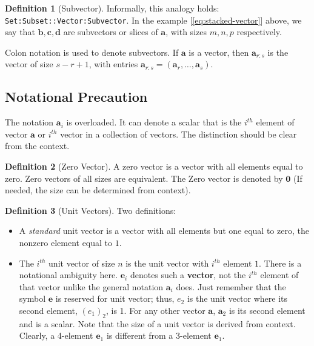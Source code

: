 \documentclass[11pt]{book}
\theoremstyle{definition}
\newtheorem{definition}{Definition}
\theoremstyle{plain}
\theoremstyle{problemstyle}
\theoremstyle{remark}
\theoremstyle{definition}
\begin{document}
\begin{definition}[Subvector]
    \label{def:subvector}
    Informally, this analogy holds: \texttt{Set:Subset::Vector:Subvector}.
    In the example [\ref{eq:stacked-vector}] above, we say that $\boldsymbol{b},\boldsymbol{c},\boldsymbol{d}$ are subvectors or slices of $\boldsymbol{a}$, with sizes $m,n,p$ respectively.

    Colon notation is used to denote subvectors. If $\boldsymbol{a}$ is a vector, then $\boldsymbol{a}_{r:s}$ is the vector of size $s−r+1$, with entries $\boldsymbol{a}_{r:s}=(\boldsymbol{a}_r,\dots,\boldsymbol{a}_s)$.
\end{definition}

\subsection*{Notational Precaution}
The notation $\boldsymbol{a}_i$ is overloaded. It can denote a scalar that is the $i^{th}$ element of vector $\boldsymbol{a}$ or $i^{th}$ vector in a collection of vectors. The distinction should be clear from the context.

\begin{definition}[Zero Vector]
    \label{def:zero-vector}
    A zero vector is a vector with all elements equal to zero. Zero vectors of all sizes are equivalent. The Zero vector is denoted by $\boldsymbol{0}$ (If needed, the size can be determined from context).
\end{definition}

\begin{definition}[Unit Vectors]
    \label{def:unit-vectors}
    Two definitions:

    \begin{itemize}
        \item A \emph{standard} unit vector is a vector with all elements but one equal to zero, the nonzero element equal to $1$.
        \item The $i^{th}$ unit vector of size $n$ is the unit vector with $i^{th}$ element $1$. There is a notational ambiguity here. $\boldsymbol{e}_i$ denotes such a \textbf{vector}, not the $i^{th}$ element of that vector unlike the general notation $\boldsymbol{a}_i$ does. Just remember that the symbol $\boldsymbol{e}$ is reserved for unit vector; thus, $e_2$ is the unit vector where its second element, $(e_1)_2$, is 1. For any other vector $\boldsymbol{a}$, $\boldsymbol{a}_2$ is its second element and is a scalar. Note that the size of a unit vector is derived from context. Clearly, a 4-element $\boldsymbol{e}_1$ is different from a 3-element $\boldsymbol{e}_1$.
    \end{itemize}
\end{definition}
\end{document}
